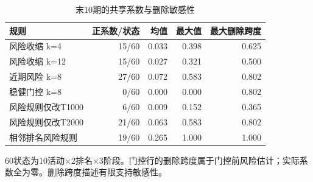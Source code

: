 \begin{table}[!htbp]\centering
\caption{末10期的共享系数与删除敏感性}\label{tab:round2lambda}
\small\setlength{\tabcolsep}{4pt}
\begin{tabularx}{\linewidth}{L r r r r}\toprule
规则 & 正系数/状态 & 均值 & 最大值 & 最大删除跨度 \\
\midrule
风险收缩 k=4 & 15/60 & 0.033 & 0.398 & 0.625 \\
风险收缩 k=12 & 15/60 & 0.027 & 0.321 & 0.500 \\
近期风险 k=8 & 27/60 & 0.072 & 0.583 & 0.802 \\
稳健门控 k=8 & 0/60 & 0.000 & 0.000 & 0.802 \\
风险规则仅改T1000 & 6/60 & 0.009 & 0.152 & 0.365 \\
风险规则仅改T2000 & 21/60 & 0.063 & 0.583 & 0.802 \\
相邻排名风险规则 & 19/60 & 0.265 & 1.000 & 1.000 \\
\bottomrule\end{tabularx}
\par\vspace{3pt}\begin{minipage}{\linewidth}\footnotesize 60状态为10活动×2排名×3阶段。门控行的删除跨度属于门控前风险估计；实际系数全为零。删除跨度描述有限支持敏感性。\end{minipage}
\end{table}
